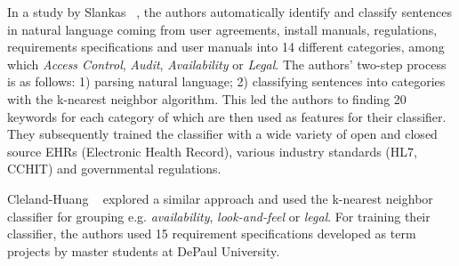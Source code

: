 In a study by Slankas \etal~\cite{Slankas:2013}, the authors automatically
identify and classify sentences in natural language coming from user agreements,
install manuals, regulations, requirements specifications and user manuals into 14
different \NFR categories, among which \emph{Access Control}, \emph{Audit},
\emph{Availability} or \emph{Legal}.
The authors' two-step process is as follows: 1) parsing natural language; 2)
classifying sentences into categories with the k-nearest neighbor algorithm.
This led the authors to finding 20 keywords for each category of \NFR which are
then used as features for their classifier.
They subsequently trained the \NFR classifier with a wide variety of open and
closed source EHRs (Electronic Health Record), various industry standards (HL7, CCHIT)
and governmental regulations.

Cleland-Huang \etal~\cite{Cleland-Huang2007} explored a similar approach and
used the k-nearest neighbor classifier for grouping \NFRs e.g.
\emph{availability}, \emph{look-and-feel} or \emph{legal}. For training their
classifier, the authors used 15 requirement specifications developed as term
projects by master students at DePaul University.
